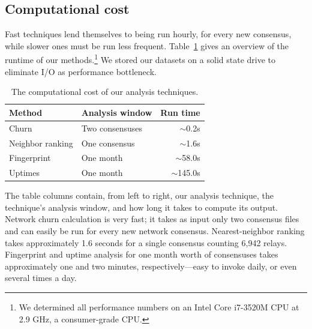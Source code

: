 \subsection{Computational cost}
\label{sec:performance}
Fast techniques lend themselves to being run hourly, for every new consensus,
while slower ones must be run less frequent.  Table~\ref{tab:exp-deployment}
gives an overview of the runtime of our methods.\footnote{We determined all
performance numbers on an Intel Core i7-3520M CPU at 2.9 GHz, a consumer-grade
CPU.}  We stored our datasets on a solid state drive to eliminate I/O as
performance bottleneck.

\begin{table}[t]
	\centering
	\begin{tabular}{l l r}
	\toprule
	\textbf{Method} & \textbf{Analysis window} & \textbf{Run time} \\
	\midrule
	Churn & Two consensuses & $\sim$0.2s \\
	Neighbor ranking & One consensus & $\sim$1.6s \\
	Fingerprint & One month & $\sim$58.0s \\
	Uptimes & One month & $\sim$145.0s \\
	\bottomrule
	\end{tabular}
	\caption{The computational cost of our analysis techniques.}
	\label{tab:exp-deployment}
\end{table}

The table columns contain, from left to right, our analysis technique, the
technique's analysis window, and how long it takes to compute its output.
Network churn calculation is very fast; it takes as input only two consensus
files and can easily be run for every new network consensus.  Nearest-neighbor
ranking takes approximately 1.6 seconds for a single consensus counting 6,942
relays.  Fingerprint and uptime analysis for one month worth of consensuses
takes approximately one and two minutes, respectively---easy to invoke daily, or
even several times a day.

